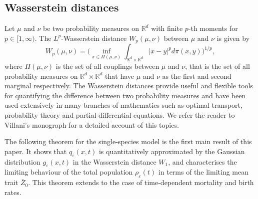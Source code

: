 \documentclass[]{article}
\theoremstyle{remark}
\begin{document}
\subsection*{Wasserstein distances}
Let $\mu$ and $\nu$ be two probability measures on $\mathbb{R}^d$ with finite $p$-th moments for $p\in [1,\infty)$. The $L^p$-Wasserstein distance $W_p(\mu,\nu)$ between $\mu$ and $\nu$ is given by
\begin{equation}
 W_p(\mu,\nu)=\Big(\inf_{\pi\in \Pi(\mu,\nu)}\int_{\mathbb{R}^d\times \mathbb{R}^d}|x-y|^p d\pi(x,y)\Big)^{1/p},   
\end{equation}
where $\Pi(\mu,\nu)$ is the set of all couplings between $\mu$ and $\nu$, that is the set of all probability measures on $\mathbb{R}^d\times \mathbb{R}^d$ that have $\mu$ and $\nu$ as the first and second marginal respectively. The Wasserstein distances provide useful and flexible tools for quantifying the difference between two probability measures and have been used extensively in many branches of mathematics such as optimal transport, probability theory and partial differential equations. We refer the reader to Villani's monograph \cite{villani2021topics} for a detailed account of this topics.

The following theorem for the single-species model is the first main result of this paper. It shows that $q_\varepsilon(x,t)$ is quantitatively approximated by the Gaussian distribution $g_\varepsilon(x,t)$ in the Wasserstein distance $W_1$, and characterises the limiting behaviour of the total population $\rho_\varepsilon(t)$ in terms of the limiting mean trait $\bar{Z}_0$. This theorem extends \cite[Theorem 2]{GHM} to the case of time-dependent mortality and birth rates.
\end{document}
